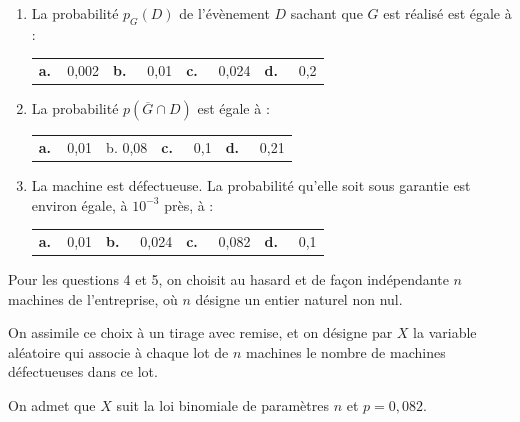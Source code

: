 \medskip

\begin{enumerate}
\item La probabilité $p_G(D)$ de l'évènement $D$ sachant que $G$ est réalisé est égale à :
\begin{center}
\begin{tabularx}{\linewidth}{*{4}{X}}
\textbf{a.~~}0,002 &\textbf{b.~~} 0,01 &\textbf{c.~~} 0,024 & \textbf{d.~~} 0,2
\end{tabularx}
\end{center}

\item La probabilité $p\left(\overline{G} \cap D\right)$ est égale à :
\begin{center}
\begin{tabularx}{\linewidth}{*{4}{X}}
\textbf{a.~~}0,01 &b. 0,08 &\textbf{c.~~} 0,1  &\textbf{d.~~} 0,21
\end{tabularx}
\end{center}
\item La machine est défectueuse. La probabilité qu'elle soit sous garantie est
environ égale, à $10^{-3}$ près, à : 
\begin{center}
\begin{tabularx}{\linewidth}{*{4}{X}}
\textbf{a.~~}0,01  &\textbf{b.~~} 0,024  &\textbf{c.~~} 0,082 &\textbf{d.~~} 0,1
\end{tabularx}
\end{center}

\end{enumerate}

Pour les questions 4 et 5, on choisit au hasard et de façon indépendante $n$ machines de l'entreprise, où $n$ désigne un entier naturel non nul. 

On assimile ce choix à un tirage avec remise, et on désigne par $X$ la variable aléatoire qui associe à chaque lot de $n$ machines le nombre de machines défectueuses dans ce lot.

On admet que $X$ suit la loi binomiale de paramètres $n$ et $p = 0,082$.

